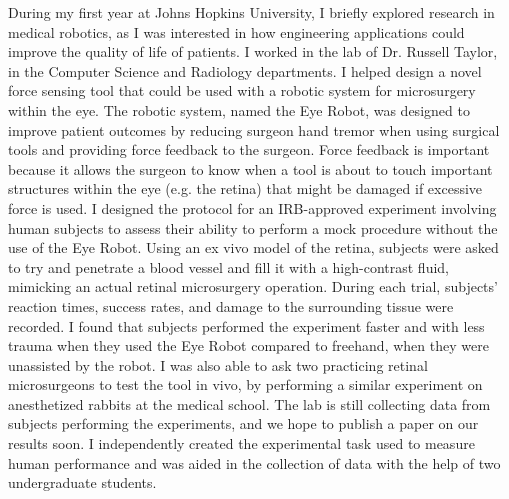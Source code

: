 \documentclass[11pt,notitlepage]{article}
\begin{document}
During my first year at Johns Hopkins University, I briefly explored research in medical robotics, as I was interested in how engineering applications could improve the quality of life of patients. I worked in the lab of Dr. Russell Taylor, in the Computer Science and Radiology departments. I helped design a novel force sensing tool that could be used with a robotic system for microsurgery within the eye. The robotic system, named the Eye Robot, was designed to improve patient outcomes by reducing surgeon hand tremor when using surgical tools and providing force feedback to the surgeon. Force feedback is important because it allows the surgeon to know when a tool is about to touch important structures within the eye (e.g. the retina) that might be damaged if excessive force is used. I designed the protocol for an IRB-approved experiment involving human subjects to assess their ability to perform a mock procedure without the use of the Eye Robot. Using an ex vivo model of the retina, subjects were asked to try and penetrate a blood vessel and fill it with a high-contrast fluid, mimicking an actual retinal microsurgery operation. During each trial, subjects' reaction times, success rates, and damage to the surrounding tissue were recorded. I found that subjects performed the experiment faster and with less trauma when they used the Eye Robot compared to freehand, when they were unassisted by the robot. I was also able to ask two practicing retinal microsurgeons to test the tool in vivo, by performing a similar experiment on anesthetized rabbits at the medical school. The lab is still collecting data from subjects performing the experiments, and we hope to publish a paper on our results soon. I independently created the experimental task used to measure human performance and was aided in the collection of data with the help of two undergraduate students.
\end{document}
